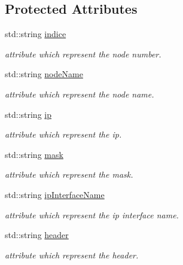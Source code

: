 \subsection*{Protected Attributes}
\begin{CompactItemize}
\item 
std::string \hyperlink{class_equipement_d5124abeb4730c781cf45e7d538ebbc2}{indice}
\begin{CompactList}\small\item\em attribute which represent the node number. \item\end{CompactList}\item 
std::string \hyperlink{class_equipement_c83d966d9331f8b92ffa09b5eaf05816}{nodeName}
\begin{CompactList}\small\item\em attribute which represent the node name. \item\end{CompactList}\item 
std::string \hyperlink{class_equipement_0b1a1b3183ff2e26d5e86adcaa1a151d}{ip}
\begin{CompactList}\small\item\em attribute which represent the ip. \item\end{CompactList}\item 
std::string \hyperlink{class_equipement_bc9e4c10eacad003427f4812890c7d52}{mask}
\begin{CompactList}\small\item\em attribute which represent the mask. \item\end{CompactList}\item 
std::string \hyperlink{class_equipement_3e3703936280f99d55619e7b86810f3b}{ipInterfaceName}
\begin{CompactList}\small\item\em attribute which represent the ip interface name. \item\end{CompactList}\item 
std::string \hyperlink{class_equipement_1c7ae76643400f1402231514c2a21ae2}{header}
\begin{CompactList}\small\item\em attribute which represent the header. \item\end{CompactList}\item 

\end{CompactItemize}
